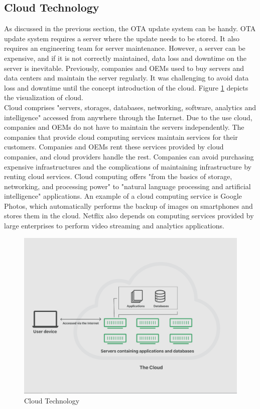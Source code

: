 \documentclass[12pt,a4paper]{article}
\begin{document}
\subsection{Cloud Technology}

As discussed in the previous section, the OTA update system can be handy. OTA update system requires a server where the update needs to be stored. It also requires an engineering team for server maintenance. However, a server can be expensive, and if it is not correctly maintained, data loss and downtime on the server is inevitable. Previously, companies and OEMs used to buy servers and data centers and maintain the server regularly. It was challenging to avoid data loss and downtime until the concept introduction of the cloud. Figure \ref{cloud} depicts the visualization of cloud. \cite{r14} \cite{r15} \\

Cloud comprises "servers, storages, databases, networking, software, analytics and intelligence" accessed from anywhere through the Internet. Due to the use cloud, companies and OEMs do not have to maintain the servers independently. The companies that provide cloud computing services maintain services for their customers. Companies and OEMs rent these services provided by cloud companies, and cloud providers handle the rest. Companies can avoid purchasing expensive infrastructures and the complications of maintaining infrastructure by renting cloud services. Cloud computing offers "from the basics of storage, networking, and processing power" to "natural language processing and artificial intelligence" applications. An example of a cloud computing service is Google Photos, which automatically performs the backup of images on smartphones and stores them in the cloud. Netflix also depends on computing services provided by large enterprises to perform video streaming and analytics applications. \cite{r14} \cite{r15} \\

\begin{figure}[H]
\centering
\includegraphics[scale=0.45]{cloud.PNG}
\caption{Cloud Technology \cite{r15}}
\label{cloud}
\end{figure}
\end{document}
